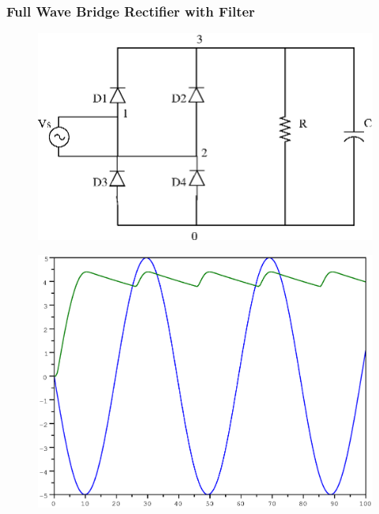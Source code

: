 \documentclass{beamer}
\begin{document}
\begin{frame}
\frametitle{Full Wave Bridge Rectifier with Filter}
\begin{minipage}[!b]{0.4\linewidth} %
\begin{figure}[h]
\centering
\includegraphics[scale=0.4]{../figures/bridgeFilter.eps}
\end{figure}
\end{minipage}
\hspace{0.5cm} %
\begin{minipage}[!b]{0.5\linewidth} %
\begin{figure}[h]
\centering
\includegraphics[scale=0.3]{../figures/bridgeFilterOutput.eps}
\end{figure}
\end{minipage}
\end{frame}
\end{document}

